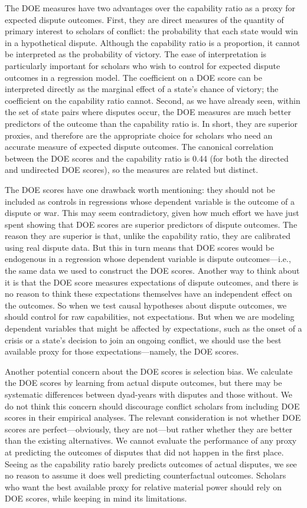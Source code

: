 The DOE measures have two advantages over the capability ratio as a proxy for expected dispute outcomes.
First, they are direct measures of the quantity of primary interest to scholars of conflict: the probability that each state would win in a hypothetical dispute.
Although the capability ratio is a proportion, it cannot be interpreted as the probability of victory.
The ease of interpretation is particularly important for scholars who wish to control for expected dispute outcomes in a regression model.
The coefficient on a DOE score can be interpreted directly as the marginal effect of a state's chance of victory; the coefficient on the capability ratio cannot.
Second, as we have already seen, within the set of state pairs where disputes occur, the DOE measures are much better predictors of the outcome than the capability ratio is.
In short, they are superior proxies, and therefore are the appropriate choice for scholars who need an accurate measure of expected dispute outcomes.
The canonical correlation between the DOE scores and the capability ratio is 0.44 (for both the directed and undirected DOE scores), so the measures are related but distinct.

The DOE scores have one drawback worth mentioning: they should not be included as controls in regressions whose dependent variable is the outcome of a dispute or war.
This may seem contradictory, given how much effort we have just spent showing that DOE scores are superior predictors of dispute outcomes.
The reason they are superior is that, unlike the capability ratio, they are calibrated using real dispute data.
But this in turn means that DOE scores would be endogenous in a regression whose dependent variable is dispute outcomes---i.e., the same data we used to construct the DOE scores.
Another way to think about it is that the DOE score measures expectations of dispute outcomes, and there is no reason to think these expectations themselves have an independent effect on the outcomes.
So when we test causal hypotheses about dispute outcomes, we should control for raw capabilities, not expectations.
But when we are modeling dependent variables that might be affected by expectations, such as the onset of a crisis or a state's decision to join an ongoing conflict, we should use the best available proxy for those expectations---namely, the DOE scores.

Another potential concern about the DOE scores is selection bias.
We calculate the DOE scores by learning from actual dispute outcomes, but there may be systematic differences between dyad-years with disputes and those without.
We do not think this concern should discourage conflict scholars from including DOE scores in their empirical analyses.
The relevant consideration is not whether DOE scores are perfect---obviously, they are not---but rather whether they are better than the existing alternatives.
We cannot evaluate the performance of any proxy at predicting the outcomes of disputes that did not happen in the first place.
Seeing as the capability ratio barely predicts outcomes of actual disputes, we see no reason to assume it does well predicting counterfactual outcomes.
Scholars who want the best available proxy for relative material power should rely on DOE scores, while keeping in mind its limitations.

